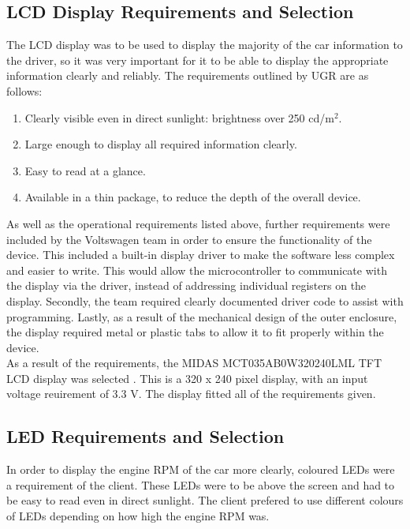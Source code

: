 \documentclass[a4paper,12pt]{article}
\begin{document}
\subsection{LCD Display Requirements and Selection}
\label{sec:display}

The LCD display was to be used to display the majority of the car information to the driver, so it was very important for it to be able to display the appropriate information clearly and reliably. The requirements outlined by UGR are as follows:

\begin{enumerate}
  \item Clearly visible even in direct sunlight: brightness over 250 cd/$\textrm{m}^2$.
  \item Large enough to display all required information clearly.
  \item Easy to read at a glance.
  \item Available in a thin package, to reduce the depth of the overall device.
\end{enumerate}
\vspace{1cm}

As well as the operational requirements listed above, further requirements were included by the Voltswagen team in order to ensure the functionality of the device. This included a built-in display driver to make the software less complex and easier to write. This would allow the microcontroller to communicate with the display via the driver, instead of addressing individual registers on the display. Secondly, the team required clearly documented driver code to assist with programming. Lastly, as a result of the mechanical design of the outer enclosure, the display required metal or plastic tabs to allow it to fit properly within the device. \\

As a result of the requirements, the MIDAS MCT035AB0W320240LML TFT LCD display was selected \cite{display_datasheet}. This is a 320 x 240 pixel display, with an input voltage reuirement of 3.3 V. The display fitted all of the requirements given.

\subsection{LED Requirements and Selection}
\label{sec:LEDs}

In order to display the engine RPM of the car more clearly, coloured LEDs were a requirement of the client. These LEDs were to be above the screen and had to be easy to read even in direct sunlight. The client prefered to use different colours of LEDs depending on how high the engine RPM was. \\
\end{document}
